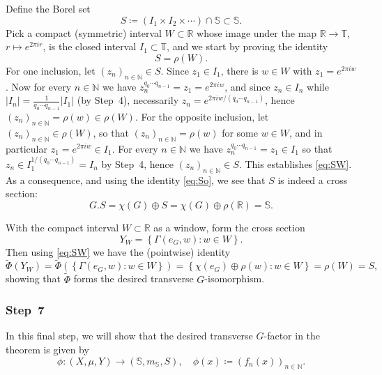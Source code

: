 \documentclass{amsart}
\numberwithin{equation}{subsection}
\theoremstyle{remark}
\begin{document}
Define the Borel set
\[S\coloneqq\left(I_{1}\times I_{2}\times\dotsm\right)\cap\mathbb{S}\subset\mathbb{S}.\]
Pick a compact (symmetric) interval \(W\subset\mathbb{R}\) whose image under the map \(\mathbb{R}\to\mathbb{T}\), \(r\mapsto e^{2\pi ir}\), is the closed interval \(I_{1}\subset\mathbb{T}\), and we start by proving the identity
\begin{equation}\label{eq:SW}
S=\rho\left(W\right).
\end{equation}
For one inclusion, let \(\left(z_{n}\right)_{n\in\mathbb{N}}\in S\). Since \(z_{1}\in I_{1}\), there is \(w\in W\) with \(z_{1}=e^{2\pi iw}\). Now for every \(n\in\mathbb{N}\) we have \(z_{n}^{q_{0}\dotsm q_{n-1}}=z_{1}=e^{2\pi iw}\), and since \(z_{n}\in I_{n}\) while \(\left|I_{n}\right|=\frac{1}{q_{0}\dotsm q_{n-1}}\left|I_{1}\right|\) (by Step~4), necessarily \(z_{n}=e^{2\pi iw/\left(q_{0}\dotsm q_{n-1}\right)}\), hence \(\left(z_{n}\right)_{n\in\mathbb{N}}=\rho\left(w\right)\in\rho\left(W\right)\). For the opposite inclusion, let \(\left(z_{n}\right)_{n\in\mathbb{N}}\in\rho\left(W\right)\), so that \(\left(z_{n}\right)_{n\in\mathbb{N}}=\rho\left(w\right)\) for some \(w\in W\), and in particular \(z_{1}=e^{2\pi iw}\in I_{1}\). For every \(n\in\mathbb{N}\) we have \(z_{n}^{q_{0}\dotsm q_{n-1}}=z_{1}\in I_{1}\) so that \(z_{n}\in I_{1}^{1/\left(q_{0}\dotsm q_{n-1}\right)}=I_{n}\) by Step~4, hence \(\left(z_{n}\right)_{n\in\mathbb{N}}\in S\). This establishes \eqref{eq:SW}. As a consequence, and using the identity \eqref{eq:So}, we see that \(S\) is indeed a cross section:
\[G.S=\chi\left(G\right)\oplus S=\chi\left(G\right)\oplus\rho\left(\mathbb{R}\right)=\mathbb{S}.\]

With the compact interval \(W\subset\mathbb{R}\) as a window, form the cross section
\[Y_{W}=\left\{\Gamma\left(e_{G},w\right):w\in W\right\}.\]
Then using \eqref{eq:SW} we have the (pointwise) identity
\[\widetilde{\Phi}\left(Y_{W}\right)=\widetilde{\Phi}\left(\left\{\Gamma\left(e_{G},w\right):w\in W\right\} \right)=\left\{ \chi\left(e_{G}\right)\oplus\rho\left(w\right):w\in W\right\} =\rho\left(W\right)=S,\]
showing that \(\widetilde{\Phi}\) forms the desired transverse \(G\)-isomorphism.

\subsubsection*{\textbf{Step~7}}

In this final step, we will show that the desired transverse \(G\)-factor in the theorem is given by
\[\phi:\left(X,\mu,Y\right)\longrightarrow\left(\mathbb{S},m_{\mathbb{S}},S\right),\quad\phi\left(x\right)\coloneqq\left(f_{n}\left(x\right)\right)_{n\in\mathbb{N}}.\]
\end{document}
